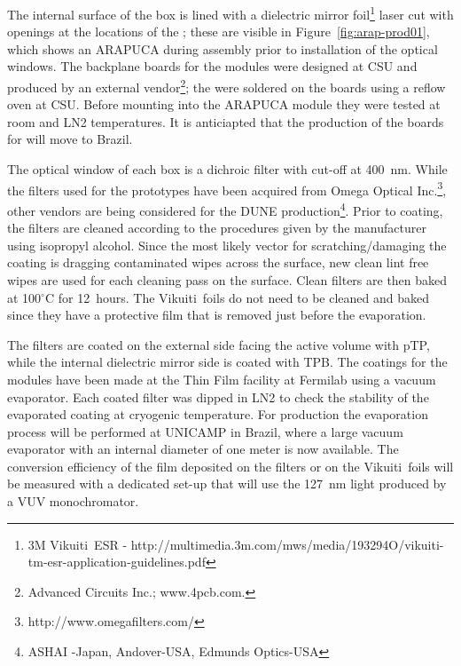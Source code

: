 The internal surface of the box is lined with a dielectric mirror foil\footnote{3M Vikuiti\texttrademark\  ESR - http://multimedia.3m.com/mws/media/193294O/vikuiti-tm-esr-application-guidelines.pdf} laser cut with openings at the locations of the ; these are visible in Figure~\ref{fig:arap-prod01}, which shows an ARAPUCA during assembly prior to installation of the optical windows. The backplane  boards for the  modules were designed at CSU and produced by an external vendor\footnote{Advanced Circuits Inc.; www.4pcb.com.}; the  were soldered on the boards using a reflow oven at CSU. Before mounting into the ARAPUCA module they were tested at room and LN2 temperatures. It is anticiapted that the production of the boards for   will move to Brazil.

The optical window of each box is a dichroic filter with cut-off at \SI{400}{nm}. While the filters used for the  prototypes have been acquired from Omega Optical Inc.\footnote{http://www.omegafilters.com/}, other vendors are being considered for the DUNE production\footnote{ASHAI -Japan, Andover-USA, Edmunds Optics-USA}.
Prior to coating, the filters are cleaned according to the procedures given by the manufacturer using isopropyl alcohol. Since the most likely vector for scratching/damaging the coating is dragging contaminated wipes across the surface, new clean lint free wipes are used for each  cleaning pass on the surface. Clean filters are then baked at 100$^\circ$C for \SI{12}{hours}. The Vikuiti\texttrademark\  foils do not need to be cleaned and baked since they have a protective film that is removed just before the evaporation.
   
The filters are coated on the external side facing the \lar active volume with pTP,
while the internal dielectric mirror side is coated with TPB.
The coatings for the  modules have been made at the Thin Film facility at Fermilab using a vacuum evaporator. Each coated filter was dipped in LN2 to check the stability of the evaporated coating at cryogenic temperature. For   production the evaporation process will be performed at UNICAMP in Brazil, where a large vacuum evaporator with an internal diameter of one meter is now available. The  conversion efficiency of the film deposited on the filters or on the Vikuiti\texttrademark\   foils will be measured with a dedicated set-up that will use the \SI{127}{nm} light produced by a VUV monochromator.


